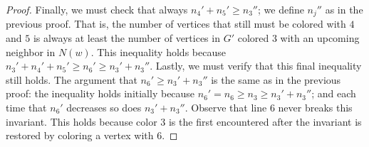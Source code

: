 \documentclass[11pt]{article}
\theoremstyle{definition}
\renewcommand\ge\geqslant
\begin{document}
\begin{proof}
	Finally, we must check that always $n_4'+n_5'\ge n_3''$; we define $n_j''$ as in the previous proof.  
	That is, the number of vertices that still must be colored with $4$ and $5$ is always at least the number of 
	vertices in $G'$ colored $3$ with an upcoming neighbor in $N(w)$.  This inequality holds because $n_3'+n_4'+n_5' \ge n_6' \ge n_3' + n_3''$.
	Lastly, we must verify that this final inequality still holds.
	The argument that $n_6'\ge n_3'+n_3''$ is the same as in the previous proof: the inequality holds initially because $n_6' = n_6\ge n_3 \ge n_3'+n_3''$;
	and each time that $n_6'$ decreases so does $n_3'+n_3''$.  Observe that line $6$ never breaks this invariant.
	This holds because color $3$ is the first encountered after the invariant is restored by coloring a vertex with $6$.
\end{proof}
\end{document}
